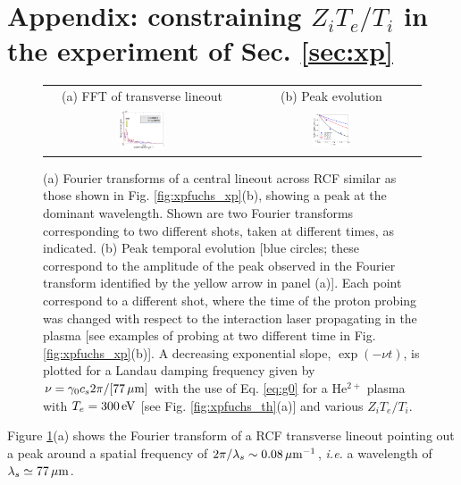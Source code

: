 \documentclass[
 reprint,
 amsmath,amssymb,
 aps,
]{revtex4-1}
\begin{document}
\section*{Appendix: constraining $Z_iT_e/T_i$ in the experiment of Sec. \ref{sec:xp}}
\label{sec:ztesti}
\setcounter{equation}{0} 
\renewcommand{\theequation}{A\arabic{equation}}
\setcounter{figure}{0} 
\renewcommand{\thefigure}{A\arabic{figure}}
\begin{figure}
\begin{tabular}{cc}
(a) FFT of transverse lineout&
(b) Peak evolution\\
\includegraphics[width=0.24\textwidth]{fucshsfft.png}& 
\includegraphics[width=0.22\textwidth]{fuchsztesti.png}
\end{tabular}
\caption{ \label{fig:xpfuchs_ap}  
(a) Fourier transforms of a central lineout across RCF similar as those shown in Fig. \ref{fig:xpfuchs_xp}(b), showing a peak at the dominant wavelength. Shown are two Fourier transforms corresponding to two different shots, taken at different times, as indicated.
(b) Peak temporal evolution [blue circles; these correspond to the amplitude of the peak observed in the Fourier transform identified by the yellow arrow in panel (a)]. Each point correspond to a different shot, where the time of the proton probing was changed with respect to the interaction laser propagating in the plasma [see examples of probing at two different time in  Fig. \ref{fig:xpfuchs_xp}(b)]. A decreasing exponential slope,  $\exp(-\nu t)$, is plotted for a Landau damping frequency given by $\nu=\gamma_0c_s2\pi/[77\,\rm\mu m]$ with the use of  Eq. \eqref{eq:g0} for a He$^{2+}$ plasma with $T_e=300\,\rm eV$ [see Fig. \ref{fig:xpfuchs_th}(a)] and various $Z_iT_e/T_i$.
}
\end{figure}
Figure \ref{fig:xpfuchs_ap}(a) shows the Fourier transform of a RCF transverse lineout pointing out a peak around a spatial frequency of  $2\pi/\lambda_s\sim 0.08\, \rm \mu m^{-1}$, \emph{i.e.} a wavelength of $\lambda_s \simeq 77\, \rm \mu m$.
\end{document}
